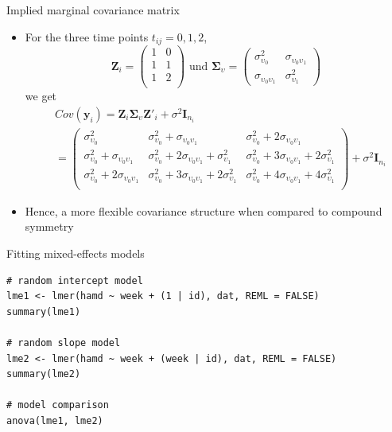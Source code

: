\documentclass[aspectratio=169]{beamer}
\newcommand{\vect}[1]{\mathbf{#1}}
\newcommand{\mat}[1]{\mathbf{#1}}
\newcommand{\gmat}[1]{\boldsymbol{#1}}
\begin{document}
\begin{frame}{Implied marginal covariance matrix}
  \begin{itemize}
    \item For the three time points $t_{ij} = 0, 1, 2$,
\[
  \mat{Z}_i =
    \begin{pmatrix}
      1 & 0 \\
      1 & 1 \\
      1 & 2 \\
    \end{pmatrix}
  \text{ und }
  \gmat{\Sigma}_\upsilon =
    \begin{pmatrix}
      \sigma^2_{\upsilon_0} & \sigma_{\upsilon_0 \upsilon_1} \\
      \sigma_{\upsilon_0 \upsilon_1} & \sigma^2_{\upsilon_1}
    \end{pmatrix}
\]
we get
\begin{align*}
  & Cov(\vect{y}_i) =
    \mat{Z}_i \gmat{\Sigma}_\upsilon \mat{Z}'_i + \sigma^2 \mat{I}_{n_i} \\
  &= \begin{pmatrix}
    \sigma^2_{\upsilon_0}                                    & \sigma^2_{\upsilon_0} + \sigma_{\upsilon_0 \upsilon_1}                             & \sigma^2_{\upsilon_0} + 2 \sigma_{\upsilon_0 \upsilon_1} \\
    \sigma^2_{\upsilon_0} + \sigma_{\upsilon_0 \upsilon_1}   & \sigma^2_{\upsilon_0} + 2 \sigma_{\upsilon_0 \upsilon_1} + \sigma^2_{\upsilon_1}   & \sigma^2_{\upsilon_0} + 3 \sigma_{\upsilon_0 \upsilon_1} + 2 \sigma^2_{\upsilon_1} \\
    \sigma^2_{\upsilon_0} + 2 \sigma_{\upsilon_0 \upsilon_1} & \sigma^2_{\upsilon_0} + 3 \sigma_{\upsilon_0 \upsilon_1} + 2 \sigma^2_{\upsilon_1} & \sigma^2_{\upsilon_0} + 4 \sigma_{\upsilon_0 \upsilon_1} + 4 \sigma^2_{\upsilon_1} \\
  \end{pmatrix}
   + \sigma^2 \mat{I}_{n_i}
\end{align*}
\item Hence, a more flexible covariance structure when compared to compound
  symmetry
  \end{itemize}
\end{frame}

\begin{frame}[fragile]{Fitting mixed-effects models}
\begin{lstlisting}
# random intercept model
lme1 <- lmer(hamd ~ week + (1 | id), dat, REML = FALSE)
summary(lme1)

# random slope model
lme2 <- lmer(hamd ~ week + (week | id), dat, REML = FALSE)
summary(lme2)

# model comparison
anova(lme1, lme2)
\end{lstlisting}
\end{frame}
 
\end{document}
